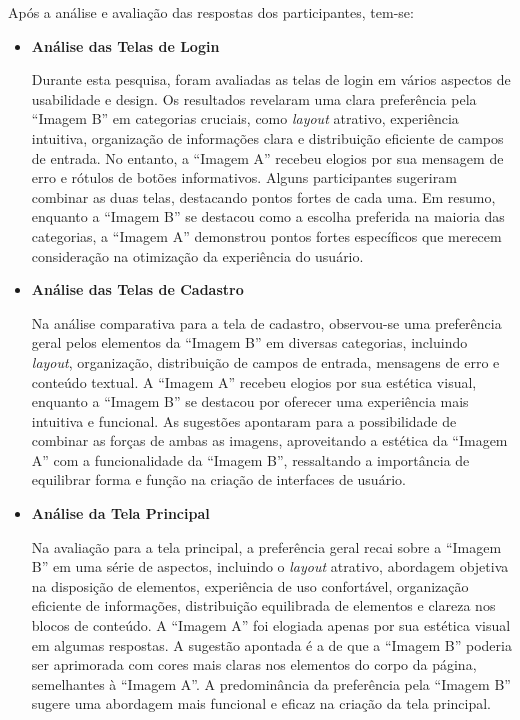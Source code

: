 Após a análise e avaliação das respostas dos participantes, tem-se: 

\begin{itemize}
    \item \textbf{Análise das Telas de Login}
    
    Durante esta pesquisa, foram avaliadas as telas de login em vários aspectos de usabilidade e design. Os resultados revelaram uma clara preferência pela ``Imagem B'' em categorias cruciais, como \textit{layout} atrativo, experiência intuitiva, organização de informações clara e distribuição eficiente de campos de entrada. No entanto, a ``Imagem A'' recebeu elogios por sua mensagem de erro e rótulos de botões informativos. Alguns participantes sugeriram combinar as duas telas, destacando pontos fortes de cada uma. Em resumo, enquanto a ``Imagem B'' se destacou como a escolha preferida na maioria das categorias, a ``Imagem A'' demonstrou pontos fortes específicos que merecem consideração na otimização da experiência do usuário.
    
    \item \textbf{Análise das Telas de Cadastro}
    
    Na análise comparativa para a tela de cadastro, observou-se uma preferência geral pelos elementos da ``Imagem B'' em diversas categorias, incluindo \textit{layout}, organização, distribuição de campos de entrada, mensagens de erro e conteúdo textual. A ``Imagem A'' recebeu elogios por sua estética visual, enquanto a ``Imagem B'' se destacou por oferecer uma experiência mais intuitiva e funcional. As sugestões apontaram para a possibilidade de combinar as forças de ambas as imagens, aproveitando a estética da ``Imagem A'' com a funcionalidade da ``Imagem B'', ressaltando a importância de equilibrar forma e função na criação de interfaces de usuário.
    
    \item \textbf{Análise da Tela Principal}
    
    Na avaliação para a tela principal, a preferência geral recai sobre a ``Imagem B'' em uma série de aspectos, incluindo o \textit{layout} atrativo, abordagem objetiva na disposição de elementos, experiência de uso confortável, organização eficiente de informações, distribuição equilibrada de elementos e clareza nos blocos de conteúdo. A ``Imagem A'' foi elogiada apenas por sua estética visual em algumas respostas. A sugestão apontada é a de que a ``Imagem B'' poderia ser aprimorada com cores mais claras nos elementos do corpo da página, semelhantes à ``Imagem A''. A predominância da preferência pela ``Imagem B'' sugere uma abordagem mais funcional e eficaz na criação da tela principal.
    

\end{itemize}
